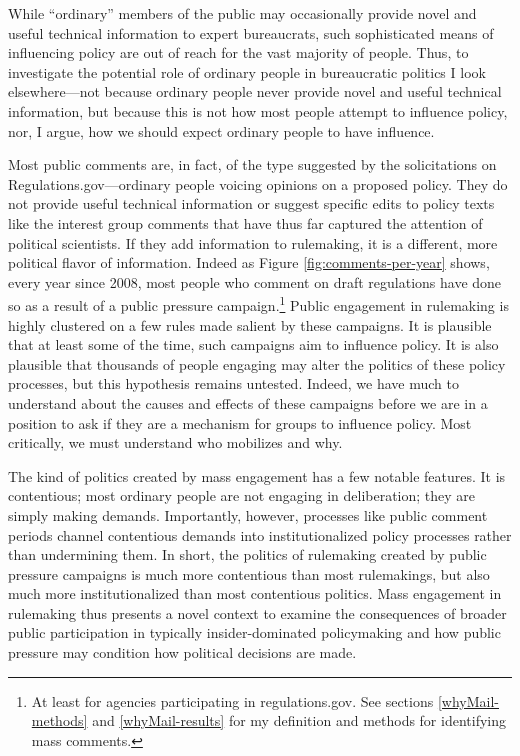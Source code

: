 \documentclass[
      12pt,
        ]{article}
\begin{document}
While ``ordinary'' members of the public may occasionally provide novel
and useful technical information to expert bureaucrats, such
sophisticated means of influencing policy are out of reach for the vast
majority of people. Thus, to investigate the potential role of ordinary
people in bureaucratic politics I look elsewhere---not because ordinary
people never provide novel and useful technical information, but because
this is not how most people attempt to influence policy, nor, I argue,
how we should expect ordinary people to have influence.

Most public comments are, in fact, of the type suggested by the
solicitations on Regulations.gov---ordinary people voicing opinions on a proposed policy. They do not provide useful technical information or
suggest specific edits to policy texts like the interest group comments
that have thus far captured the attention of political scientists. If
they add information to rulemaking, it is a different, more political
flavor of information. Indeed as Figure
\ref{fig:comments-per-year} shows, every year since 2008, most people who
comment on draft regulations have done so as a result of a public pressure campaign.\footnote{At least for agencies participating in regulations.gov. See
  sections
  \ref{whyMail-methods} and
  \ref{whyMail-results} for my definition and methods for identifying mass comments.} Public engagement in rulemaking is highly
clustered on a few rules made salient by these campaigns. It is
plausible that at least some of the time, such campaigns aim to
influence policy. It is also plausible that thousands of people engaging
may alter the politics of these policy processes, but this hypothesis
remains untested. Indeed, we have much to understand about the causes
and effects of these campaigns before we are in a position to ask if
they are a mechanism for groups to influence policy. Most critically, we
must understand who mobilizes and why.

The kind of politics created by mass engagement has a few notable
features. It is contentious; most ordinary people are not engaging in
deliberation; they are simply making demands. Importantly, however,
processes like public comment periods channel contentious demands into
institutionalized policy processes rather than undermining them. In
short, the politics of rulemaking created by public pressure campaigns is much
more contentious than most rulemakings, but also much more
institutionalized than most contentious politics. Mass engagement in
rulemaking thus presents a novel context to examine the consequences of
broader public participation in typically insider-dominated policymaking and how
public pressure may condition how political decisions are made.
\end{document}

